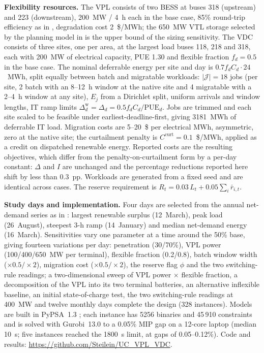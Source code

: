 \documentclass[conference]{IEEEtran}
\begin{document}
\textbf{Flexibility resources.} The VPL consists of two BESS at buses 318 (upstream) and 223 (downstream), 200~MW / 4~h each in the base case, 85\% round-trip efficiency as in \cite{ferreira2026}, degradation cost 2~\$/MWh; the 650~MW VTL storage selected by the planning model in \cite{ferreira2026} is the upper bound of the sizing sensitivity. The VDC consists of three sites, one per area, at the largest load buses 118, 218 and 318, each with 200~MW of electrical capacity, PUE 1.30 and flexible fraction $f_d=0.5$ in the base case. The nominal deferrable energy per site and day is $0.7 f_d C_d\cdot 24$~MWh, split equally between batch and migratable workloads: $|\mathcal{J}| = 18$ jobs (per site, 2 batch with an 8--12~h window at the native site and 4 migratable with a 2--4~h window at any site), $E_j$ from a Dirichlet split, uniform arrivals and window lengths, IT ramp limits $\Delta^{\mathrm{w}}_d = \Delta_d = 0.5 f_d C_d/\mathrm{PUE}_d$. Jobs are trimmed and each site scaled to be feasible under earliest-deadline-first, giving 3181~MWh of deferrable IT load. Migration costs are 5--20~\$ per electrical MWh, asymmetric, zero at the native site; the curtailment penalty is $C^{\mathrm{curt}} = 0.1$~\$/MWh, applied as a credit on dispatched renewable energy. Reported costs are the resulting objectives, which differ from the penalty-on-curtailment form by a per-day constant: $\Delta$ and $I$ are unchanged and the percentage reductions reported here shift by less than 0.3~pp. Workloads are generated from a fixed seed and are identical across cases. The reserve requirement is $R_t = 0.03\,L_t + 0.05 \sum_i \bar r_{i,t}$.

\textbf{Study days and implementation.} Four days are selected from the annual net-demand series as in \cite{ferreira2026}: largest renewable surplus (12~March), peak load (26~August), steepest 3-h ramp (14~January) and median net-demand energy (16~March). Sensitivities vary one parameter at a time around the 50\% base, giving fourteen variations per day: penetration (30/70\%), VPL power (100/400/650~MW per terminal), flexible fraction (0.2/0.8), batch window width ($\times0.5/\times2$), migration cost ($\times0.5/\times2$), the reserve flag $\phi$ and the two switching-rule readings; a two-dimensional sweep of VPL power $\times$ flexible fraction, a decomposition of the VPL into its two terminal batteries, an alternative inflexible baseline, an initial state-of-charge test, the two switching-rule readings at 400~MW and twelve monthly days complete the design (328 instances). Models are built in PyPSA~1.3 \cite{brown2018pypsa}; each instance has 5256 binaries and 45\,910 constraints and is solved with Gurobi~13.0 to a 0.05\% MIP gap on a 12-core laptop (median 10~s; five instances reached the 1800~s limit, at gaps of 0.05--0.12\%). Code and results: \url{https://github.com/Steilein/UC_VPL_VDC}.
\end{document}
